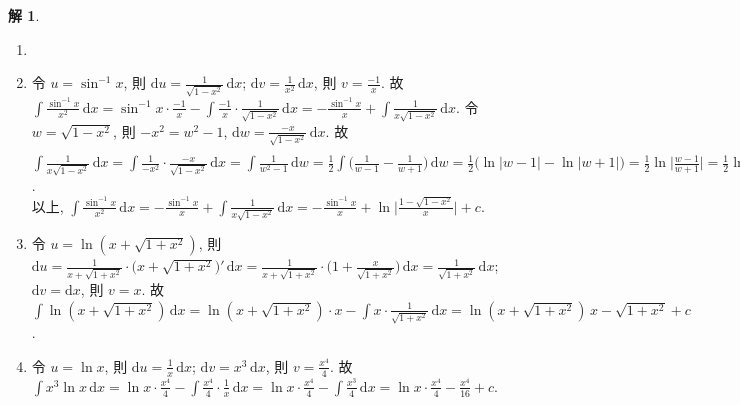 \documentclass[12pt]{extarticle}
\newcommand{\ds}{\displaystyle}
\theoremstyle{definition}
\newtheorem*{sol}{解}
\begin{document}
\begin{sol}
  \begin{enumerate}\setlength{\itemsep}{0pt}
    \item[]
    \item 令 $\ds u = \sin^{-1}x$, 則 $\ds\text{d}u = \frac{1}{\sqrt{1 - x^2}}\,\text{d}x$; $\ds\text{d}v = \frac{1}{x^2}\,\text{d}x$, 則 $\ds v = \frac{-1}{x}$. 故 $\ds\int\frac{\sin^{-1}x}{x^2}\,\text{d}x = \sin^{-1}x\cdot\frac{-1}{x} - \int\!\frac{-1}{x}\cdot\frac{1}{\sqrt{1 - x^2}}\,\text{d}x = -\frac{\sin^{-1}x}{x} + \int\!\frac{1}{x\sqrt{1 - x^2}}\,\text{d}x$. 令 $\ds w = \sqrt{1 - x^2}$, 則 $-x^2 = w^2 - 1$, $\ds\text{d}w = \frac{-x}{\sqrt{1 - x^2}}\,\text{d}x$. 故 $\ds\int\!\frac{1}{x\sqrt{1 - x^2}}\,\text{d}x = \int\!\frac{1}{-x^2}\cdot\frac{-x}{\sqrt{1 - x^2}}\,\text{d}x = \int\frac{1}{w^2 - 1}\,\text{d}w = \frac{1}{2}\int\Big(\frac{1}{w - 1} - \frac{1}{w + 1}\Big)\,\text{d}w = \frac{1}{2}\big(\ln|w - 1| - \ln|w + 1|\big) = \frac{1}{2}\ln\Big|\frac{w - 1}{w + 1}\Big| = \frac{1}{2}\ln\bigg|\frac{\sqrt{1 - x^2} - 1}{\sqrt{1 - x^2} + 1}\bigg| = \frac{1}{2}\ln\bigg|\frac{1 - \sqrt{1 - x^2}}{1 + \sqrt{1 - x^2}}\bigg| = \frac{1}{2}\ln\bigg|\frac{1 - \sqrt{1 - x^2}}{1 + \sqrt{1 - x^2}}\cdot\frac{1 - \sqrt{1 - x^2}}{1 - \sqrt{1 - x^2}}\bigg| = \frac{1}{2}\ln\bigg|\frac{(1 - \sqrt{1 - x^2})^2}{x^2}\bigg| = \ln\bigg|\frac{1 - \sqrt{1 - x^2}}{x}\bigg|$. \\以上, $\ds\int\frac{\sin^{-1}x}{x^2}\,\text{d}x = - \frac{\sin^{-1}x}{x} + \int\!\frac{1}{x\sqrt{1 - x^2}}\,\text{d}x = - \frac{\sin^{-1}x}{x} + \ln\bigg|\frac{1 - \sqrt{1 - x^2}}{x}\bigg| + c$.
    \item 令 $\ds u = \ln(x + \sqrt{1 + x^2})$, 則 $\ds\text{d}u = \frac{1}{x + \sqrt{1 + x^2}}\cdot\big(x + \sqrt{1 + x^2}\big)'\,\text{d}x = \frac{1}{x + \sqrt{1 + x^2}}\cdot\Big(1 + \frac{x}{\sqrt{1 + x^2}}\Big)\,\text{d}x = \frac{1}{\sqrt{1 + x^2}}\,\text{d}x$; $\ds\text{d}v = \text{d}x$, 則 $\ds v = x$. 故 $\ds\int\ln(x + \sqrt{1 + x^2})\,\text{d}x = \ln(x + \sqrt{1 + x^2})\cdot x - \int\!x\cdot\frac{1}{\sqrt{1 + x^2}}\,\text{d}x = \ln(x + \sqrt{1 + x^2})\,x - \sqrt{1 + x^2} + c$.
    \item 令 $\ds u = \ln x$, 則 $\ds\text{d}u = \frac{1}{x}\,\text{d}x$; $\ds\text{d}v = x^3\,\text{d}x$, 則 $\ds v = \frac{x^4}{4}$.  故 $\ds\int x^3\ln x\,\text{d}x = \ln x\cdot\frac{x^4}{4} - \int\!\frac{x^4}{4}\cdot\frac{1}{x}\,\text{d}x = \ln x\cdot\frac{x^4}{4} - \int\!\frac{x^3}{4}\,\text{d}x = \ln x\cdot\frac{x^4}{4} - \frac{x^4}{16} + c$.   

\end{enumerate}
\end{sol}
\end{document}
